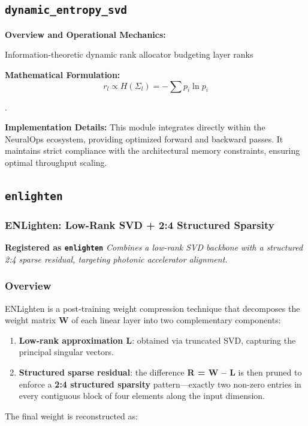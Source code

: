 \subsection{\texttt{dynamic\_entropy\_svd}}
\textbf{Overview and Operational Mechanics:}

Information-theoretic dynamic rank allocator budgeting layer ranks

\textbf{Mathematical Formulation:}
\begin{equation}
r_l \propto H(\Sigma_l) = -\sum p_i \ln p_i
\end{equation}

.

\textbf{Implementation Details:}
This module integrates directly within the NeuralOps ecosystem, providing optimized forward and backward passes. It maintains strict compliance with the architectural memory constraints, ensuring optimal throughput scaling.

\subsection{\texttt{enlighten}}
\subsubsection*{ENLighten: Low-Rank SVD + 2:4 Structured Sparsity}

\textbf{Registered as \texttt{enlighten}}
\textit{Combines a low-rank SVD backbone with a structured 2:4 sparse residual, targeting photonic accelerator alignment.}


\subsubsection*{Overview}

ENLighten is a post-training weight compression technique that decomposes the weight matrix \textbf{W} of each linear layer into two complementary components:

\begin{enumerate}
\item \textbf{Low-rank approximation L}: obtained via truncated SVD, capturing the principal singular vectors.
\item \textbf{Structured sparse residual}: the difference \textbf{R = W -- L} is then pruned to enforce a \textbf{2:4 structured sparsity} pattern---exactly two non-zero entries in every contiguous block of four elements along the input dimension.

\end{enumerate}
The final weight is reconstructed as:

